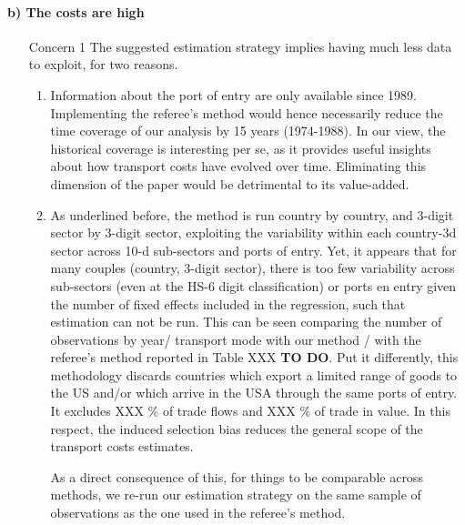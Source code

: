 \documentclass[a4paper,12pt]{article}
\begin{document}
\paragraph{b) The costs are high}
\begin{itemize}
\item[Concern 1] The suggested estimation strategy implies having much less data to exploit, for two reasons.
\begin{enumerate}
\item Information about the port of entry are only available since 1989. Implementing the referee's method would hence necessarily reduce the time coverage of our analysis by 15 years (1974-1988). In our view, the historical coverage is interesting per se, as it provides useful insights about how transport costs have evolved over time. Eliminating this dimension of the paper would be detrimental to its value-added.
\item As underlined before, the method is run country by country, and 3-digit sector by 3-digit sector, exploiting the variability within each country-3d sector across 10-d sub-sectors and ports of entry. Yet, it appears that for many couples (country, 3-digit sector), there is too few variability across sub-sectors (even at the HS-6 digit classification) or ports en entry given the number of fixed effects included in the regression, such that estimation can not be run. This can be seen comparing the number of observations by year/ transport mode with our method / with the referee's method reported in Table XXX \textbf{TO DO}. Put it differently, this methodology discards countries which export a limited range of goods to the US and/or which arrive in the USA through the same ports of entry. It excludes XXX \% of trade flows and XXX \% of trade in value. In this respect, the induced selection bias reduces the general scope of the transport costs estimates. 


    As a direct consequence of this, for things to be comparable across methods, we re-run our estimation strategy on the same sample of observations as the one used in the referee's method.


\end{enumerate}
\end{itemize}
\end{document}
